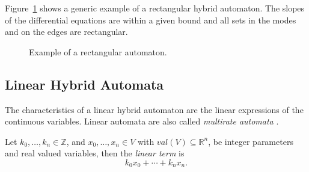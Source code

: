 \begin{ex}
Figure~\ref{fig:exrect} shows a generic example of a rectangular hybrid automaton. The slopes of the differential equations are within a given bound and all sets in the modes and on the edges are rectangular.
\begin{figure}[H]
    \begin{center}
        \caption{Example of a rectangular automaton.}
        \label{fig:exrect}
    \end{center}
\end{figure}
\end{ex}


\subsection{Linear Hybrid Automata}
The characteristics of a linear hybrid automaton are the linear expressions of the continuous variables. \cite{Alur1995a} Linear automata are also called \emph{multirate automata} \cite{Alur1995a,Alur2000}.

\begin{defi}
Let $k_{0},\ldots,k_{n}\in \mathbb{Z}$, and $x_{0},\ldots,x_{n}\in V$ with $val(V)\subseteq \mathbb{R}^n$, be integer parameters and real valued variables, then the \emph{linear term} is
\[
k_{0}x_{0} + \cdots + k_{n}x_{n}.
\]
\end{defi}

